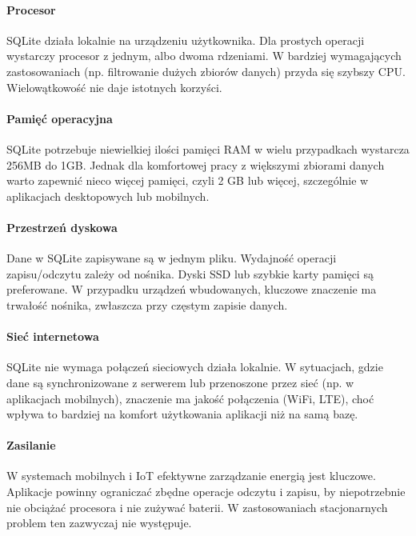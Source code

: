 \documentclass[letterpaper,10pt,polish]{sphinxmanual}
\begin{document}
\paragraph{Procesor}
\label{\detokenize{rozdzial2/Sprzet-dla-bazy-danych/source/SprzetDlaBazyDanych:id1}}
\sphinxAtStartPar
SQLite działa lokalnie na urządzeniu użytkownika. Dla prostych operacji wystarczy procesor z jednym, albo dwoma rdzeniami. W bardziej wymagających zastosowaniach (np. filtrowanie dużych zbiorów danych) przyda się szybszy CPU. Wielowątkowość nie daje istotnych korzyści.


\paragraph{Pamięć operacyjna}
\label{\detokenize{rozdzial2/Sprzet-dla-bazy-danych/source/SprzetDlaBazyDanych:id2}}
\sphinxAtStartPar
SQLite potrzebuje niewielkiej ilości pamięci RAM w wielu przypadkach wystarcza 256MB do 1GB. Jednak dla komfortowej pracy z większymi zbiorami danych warto zapewnić nieco więcej pamięci, czyli 2 GB lub więcej, szczególnie w aplikacjach desktopowych lub mobilnych.


\paragraph{Przestrzeń dyskowa}
\label{\detokenize{rozdzial2/Sprzet-dla-bazy-danych/source/SprzetDlaBazyDanych:id3}}
\sphinxAtStartPar
Dane w SQLite zapisywane są w jednym pliku. Wydajność operacji zapisu/odczytu zależy od nośnika. Dyski SSD lub szybkie karty pamięci są preferowane. W przypadku urządzeń wbudowanych, kluczowe znaczenie ma trwałość nośnika, zwłaszcza przy częstym zapisie danych.


\paragraph{Sieć internetowa}
\label{\detokenize{rozdzial2/Sprzet-dla-bazy-danych/source/SprzetDlaBazyDanych:id4}}
\sphinxAtStartPar
SQLite nie wymaga połączeń sieciowych \textendash{} działa lokalnie. W sytuacjach, gdzie dane są synchronizowane z serwerem lub przenoszone przez sieć (np. w aplikacjach mobilnych), znaczenie ma jakość połączenia (Wi\sphinxhyphen{}Fi, LTE), choć wpływa to bardziej na komfort użytkowania aplikacji niż na samą bazę.


\paragraph{Zasilanie}
\label{\detokenize{rozdzial2/Sprzet-dla-bazy-danych/source/SprzetDlaBazyDanych:id5}}
\sphinxAtStartPar
W systemach mobilnych i IoT efektywne zarządzanie energią jest kluczowe. Aplikacje powinny ograniczać zbędne operacje odczytu i zapisu, by niepotrzebnie nie obciążać procesora i nie zużywać baterii. W zastosowaniach stacjonarnych problem ten zazwyczaj nie występuje.
\end{document}
